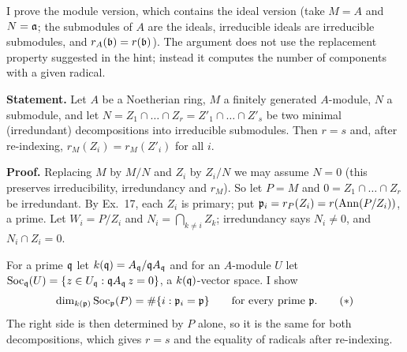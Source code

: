 \documentclass[11pt]{article}
\begin{document}
\pf
I prove the module version, which contains the ideal version (take $M=A$ and $N=\mathfrak a$; the submodules of $A$ are the ideals, irreducible ideals are irreducible submodules, and $r_A(\mathfrak b)=r(\mathfrak b)$). The argument does not use the replacement property suggested in the hint; instead it computes the number of components with a given radical.

\textbf{Statement.} Let $A$ be a Noetherian ring, $M$ a finitely generated $A$-module, $N$ a submodule, and let $N=Z_1\cap\dots\cap Z_r=Z'_1\cap\dots\cap Z'_s$ be two minimal (irredundant) decompositions into irreducible submodules. Then $r=s$ and, after re-indexing, $r_M(Z_i)=r_M(Z'_i)$ for all $i$.

\textbf{Proof.} Replacing $M$ by $M/N$ and $Z_i$ by $Z_i/N$ we may assume $N=0$ (this preserves irreducibility, irredundancy and $r_M$). So let $P=M$ and $0=Z_1\cap\dots\cap Z_r$ be irredundant. By Ex.~17, each $Z_i$ is primary; put $\mathfrak p_i=r_P(Z_i)=r(\operatorname{Ann}(P/Z_i))$, a prime. Let $W_i=P/Z_i$ and $N_i=\bigcap_{k\ne i}Z_k$; irredundancy says $N_i\ne0$, and $N_i\cap Z_i=0$.

For a prime $\mathfrak q$ let $k(\mathfrak q)=A_\mathfrak q/\mathfrak q A_\mathfrak q$ and for an $A$-module $U$ let $\operatorname{Soc}_\mathfrak q(U)=\{z\in U_\mathfrak q:\mathfrak q A_\mathfrak q\,z=0\}$, a $k(\mathfrak q)$-vector space. I show
\[
\dim_{k(\mathfrak p)}\operatorname{Soc}_\mathfrak p(P)=\#\{i:\mathfrak p_i=\mathfrak p\}\qquad\text{for every prime }\mathfrak p. \tag{$*$}
\]
The right side is then determined by $P$ alone, so it is the same for both decompositions, which gives $r=s$ and the equality of radicals after re-indexing.
\end{document}

